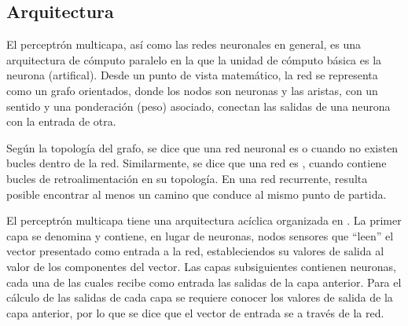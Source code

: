 %
%
\subsection{Arquitectura}
%
El perceptrón multicapa, así como las redes neuronales en general, es
una arquitectura de cómputo paralelo en la que la unidad de cómputo
básica es la neurona (artifical). Desde un punto de vista matemático,
la red se representa como un grafo orientados, donde los nodos son
neuronas y las aristas, con un sentido y una ponderación (peso)
asociado, conectan las salidas de una neurona con la entrada de otra.

Según la topología del grafo, se dice que una red neuronal es
 o  cuando no existen
bucles dentro de la red. Similarmente, se dice que una red es
, cuando contiene bucles de {retroalimentación} en su
topología. En una red recurrente, resulta posible encontrar al menos
un camino que conduce al mismo punto de partida.




El perceptrón multicapa tiene una arquitectura acíclica organizada en
. La primer capa se denomina  y contiene,
en lugar de neuronas, nodos sensores que ``leen'' el vector presentado
como entrada a la red, estableciendos su valores de salida al valor de
los componentes del vector.  Las capas subsiguientes contienen
neuronas, cada una de las cuales recibe como entrada  las
salidas de la capa anterior.  Para el cálculo de las salidas de cada
capa se requiere conocer los valores de salida de la capa anterior,
por lo que se dice que el vector de entrada se  a través de la red.


